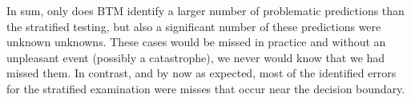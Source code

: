 In sum, only does BTM identify a larger number of problematic predictions than the stratified testing, but also a significant number of these predictions were unknown unknowns.  These cases would be missed in practice and without an unpleasant event (possibly a catastrophe), we never would know that we had missed them. In contrast, and by now as expected, most of the identified 
errors for the stratified examination were misses that occur near the decision boundary.

\begin{figure}[t]
\centering
{}
\label{fig:results}
\end{figure}

